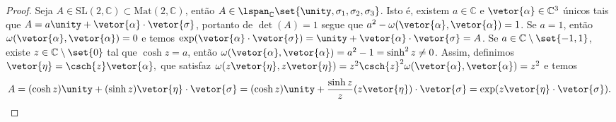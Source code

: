 \begin{proof}
    Seja \(A \in \mathrm{SL}(2,\mathbb{C}) \subset \mathrm{Mat}(2, \mathbb{C})\), então \(A \in \lspan_{\mathbb{C}}\set{\unity, \sigma_1, \sigma_2, \sigma_3}\). Isto é, existem \(a \in \mathbb{C}\) e \(\vetor{\alpha} \in \mathbb{C}^3\) únicos tais que \(A = a \unity + \vetor{\alpha}\cdot{\vetor{\sigma}}\), portanto de \(\det(A) = 1\) segue que \(a^2 - \omega(\vetor{\alpha},\vetor{\alpha})= 1\).  Se \(a = 1\), então \(\omega(\vetor{\alpha},\vetor{\alpha}) = 0\) e temos \(\exp(\vetor{\alpha}\cdot\vetor{\sigma}) = \unity + \vetor{\alpha}\cdot\vetor{\sigma} = A\). Se \(a \in \mathbb{C} \setminus\set{-1, 1}\), existe \(z\in \mathbb{C}\setminus\set{0}\) tal que \(\cosh{z} = a\), então \(\omega(\vetor{\alpha}, \vetor{\alpha}) = a^2 - 1 = \sinh^2{z} \neq 0\). Assim, definimos \(\vetor{\eta} = \csch{z} \vetor{\alpha},\) que satisfaz \(\omega(z\vetor{\eta},z\vetor{\eta}) = z^2\csch{z}^2 \omega(\vetor{\alpha}, \vetor{\alpha}) = z^2\) e temos
    \begin{equation*}
        A = (\cosh{z})\unity + (\sinh{z}) \vetor{\eta}\cdot \vetor{\sigma} = (\cosh{z})\unity + \frac{\sinh{z}}{z}(z\vetor{\eta})\cdot \vetor{\sigma} = \exp(z \vetor{\eta}\cdot \vetor{\sigma}).
    \end{equation*}
    \todo[O que acontece com \(\mathrm{SL}(2,\mathbb{C}) \ni A = -\unity = \exp\begin{smallpmatrix}
        i\pi & 0\\
        0 & i\pi
    \end{smallpmatrix} \notin \mathrm{sl}(2,\mathbb{C})\)?]
\end{proof}
